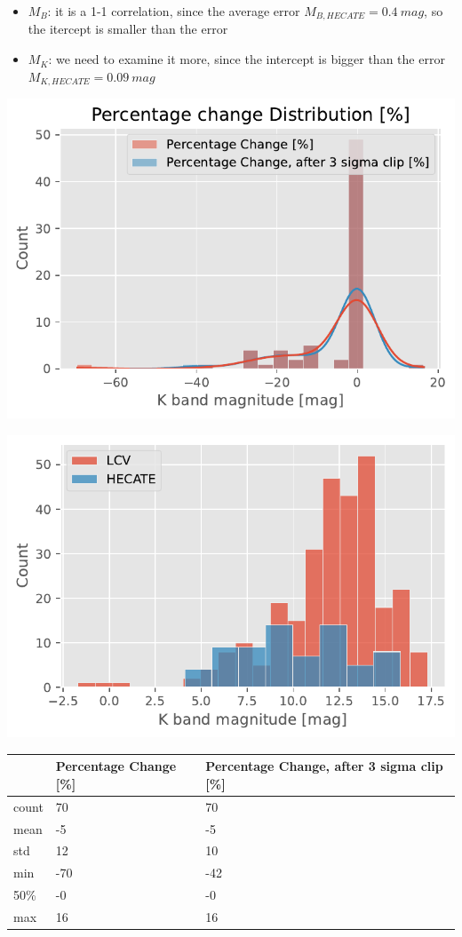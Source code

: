 \documentclass[
]{article}
\providecommand{\tightlist}{%
  \setlength{\itemsep}{0pt}\setlength{\parskip}{0pt}}\usepackage{longtable,booktabs,array}
\begin{document}
\begin{itemize}
\tightlist
\item
  \(M_B\): it is a 1-1 correlation, since the average error
  \(M_{B,HECATE} = 0.4\ mag\), so the itercept is smaller than the error
\item
  \(M_K\): we need to examine it more, since the intercept is bigger
  than the error \(M_{K,HECATE} = 0.09\ mag\)
\end{itemize}

\includegraphics{compare_files/figure-pdf/cell-35-output-1.pdf}

\includegraphics{compare_files/figure-pdf/cell-35-output-2.pdf}

\begin{longtable}[]{@{}lll@{}}
\toprule\noalign{}
& Percentage Change {[}\%{]} & Percentage Change, after 3 sigma clip
{[}\%{]} \\
\midrule\noalign{}
\endhead
\bottomrule\noalign{}
\endlastfoot
count & 70 & 70 \\
mean & -5 & -5 \\
std & 12 & 10 \\
min & -70 & -42 \\
50\% & -0 & -0 \\
max & 16 & 16 \\
\end{longtable}
\end{document}
